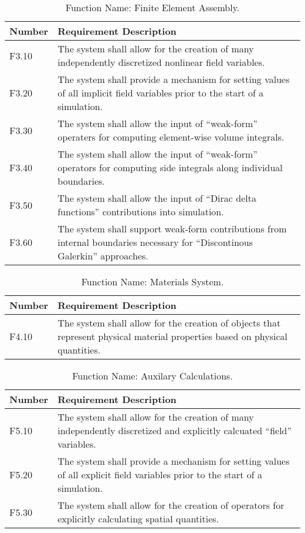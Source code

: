 \documentclass{INLreport}
\begin{document}
\begin{table}[!htbp]
  \caption{Function Name: Finite Element Assembly.\label{tab:fem}}
  \setcounter{MyThirdTableCounter}{1}
  \begin{tabular}{|l|p{12cm}|}
    \rowcolor{gray}
    Number & Requirement Description \\ \hline
    F3.10 & The system shall allow for the creation of many independently discretized nonlinear field variables. \\ \hline
    F3.20 & The system shall provide a mechanism for setting values of all implicit field variables prior to the start of a simulation. \\ \hline
    F3.30 & The system shall allow the input of ``weak-form'' operaters for computing element-wise volume integrals. \\ \hline
    F3.40 & The system shall allow the input of ``weak-form'' operators for computing side integrals along individual boundaries. \\ \hline
    F3.50 & The system shall allow the input of ``Dirac delta functions'' contributions into simulation. \\ \hline
    F3.60 & The system shall support weak-form contributions from internal boundaries necessary for ``Discontinous Galerkin'' approaches. \\ \hline
  \end{tabular}
\end{table}

\begin{table}[!htbp]
  \caption{Function Name: Materials System.\label{tab:mat}}
  \setcounter{MyFourthTableCounter}{1}
  \begin{tabular}{|l|p{12cm}|}
    \rowcolor{gray}
    Number & Requirement Description \\ \hline
    F4.10 & The system shall allow for the creation of objects that represent physical material properties based on physical quantities. \\ \hline
  \end{tabular}
\end{table}


\begin{table}[!htbp]
  \caption{Function Name: Auxilary Calculations.\label{tab:aux}}
  \setcounter{MyFifthTableCounter}{1}
  \begin{tabular}{|l|p{12cm}|}
    \rowcolor{gray}
    Number & Requirement Description \\ \hline
    F5.10 & The system shall allow for the creation of many independently discretized and explicitly calcuated ``field'' variables. \\ \hline
    F5.20 & The system shall provide a mechanism for setting values of all explicit field variables prior to the start of a simulation. \\ \hline
    F5.30 & The system shall allow for the creation of operators for explicitly calculating spatial quantities. \\ \hline
  \end{tabular}
\end{table}
\end{document}
